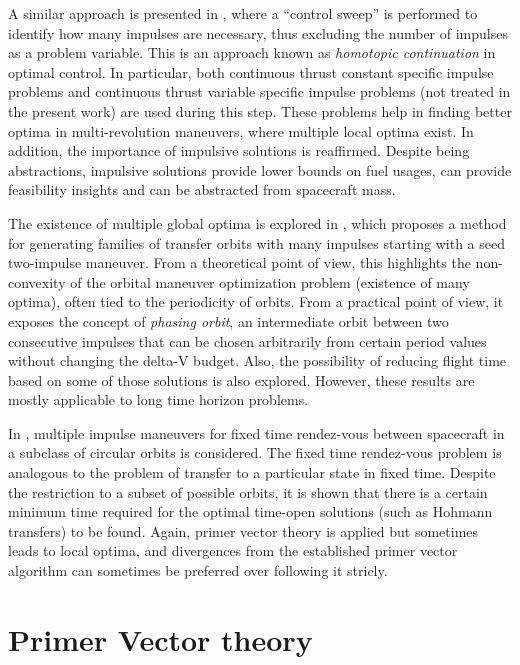 A similar approach is presented in , where a ``control sweep'' is performed to identify how many impulses are necessary, thus excluding the number of impulses as a problem variable. This is an approach known as \textit{homotopic continuation} in optimal control. In particular, both continuous thrust constant specific impulse problems and continuous thrust variable specific impulse problems (not treated in the present work) are used during this step. These problems help in finding better optima in multi-revolution maneuvers, where multiple local optima exist. In addition, the importance of impulsive solutions is reaffirmed. Despite being abstractions, impulsive solutions provide lower bounds on fuel usages, can provide feasibility insights and can be abstracted from spacecraft mass.

The existence of multiple global optima is explored in , which proposes a method for generating families of transfer orbits with many impulses starting with a seed two-impulse maneuver. From a theoretical point of view, this highlights the non-convexity of the orbital maneuver optimization problem (existence of many optima), often tied to the periodicity of orbits. From a practical point of view, it exposes the concept of \textit{phasing orbit}, an intermediate orbit between two consecutive impulses that can be chosen arbitrarily from certain period values without changing the delta-V budget. Also, the possibility of reducing flight time based on some of those solutions is also explored. However, these results are mostly applicable to long time horizon problems.

In , multiple impulse maneuvers for fixed time rendez-vous between spacecraft in a subclass of circular orbits is considered. The fixed time rendez-vous problem is analogous to the problem of transfer to a particular state in fixed time. Despite the restriction to a subset of possible orbits, it is shown that there is a certain minimum time required for the optimal time-open solutions (such as Hohmann transfers) to be found. Again, primer vector theory is applied but sometimes leads to local optima, and divergences from the established primer vector algorithm can sometimes be preferred over following it stricly.

\section{Primer Vector theory}

